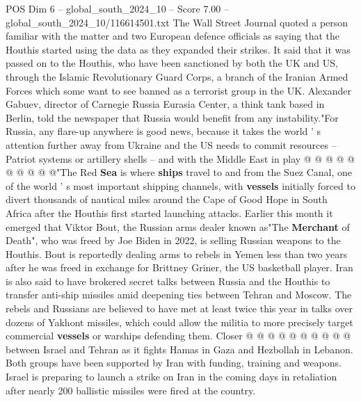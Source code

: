 \begin{textsample}{POS Dim 6 – global\_south\_2024\_10 – Score 7.00 – global\_south\_2024\_10/116614501.txt}
The Wall Street Journal quoted a person familiar with the matter and two European defence officials as saying that the Houthis started using the data as they expanded their strikes.
It said that it was passed on to the Houthis, who have been sanctioned by both the UK and US, through the Islamic Revolutionary Guard Corps, a branch of the Iranian Armed Forces which some want to see banned as a terrorist group in the UK.
Alexander Gabuev, director of Carnegie Russia Eurasia Center, a think tank based in Berlin, told the newspaper that Russia would benefit from any instability."For Russia, any flare-up anywhere is good news, because it takes the world ' s attention further away from Ukraine and the US needs to commit resources -- Patriot systems or artillery shells -- and with the Middle East in play @ @ @ @ @ @ @ @ @ @"The Red \textbf{Sea} is where \textbf{ships} travel to and from the Suez Canal, one of the world ' s most important shipping channels, with \textbf{vessels} initially forced to divert thousands of nautical miles around the Cape of Good Hope in South Africa after the Houthis first started launching attacks.
Earlier this month it emerged that Viktor Bout, the Russian arms dealer known as"The \textbf{Merchant} of Death", who was freed by Joe Biden in 2022, is selling Russian weapons to the Houthis.
Bout is reportedly dealing arms to rebels in Yemen less than two years after he was freed in exchange for Brittney Griner, the US basketball player.
Iran is also said to have brokered secret talks between Russia and the Houthis to transfer anti-ship missiles amid deepening ties between Tehran and Moscow.
The rebels and Russians are believed to have met at least twice this year in talks over dozens of Yakhont missiles, which could allow the militia to more precisely target commercial \textbf{vessels} or warships defending them.
Closer @ @ @ @ @ @ @ @ @ @ between Israel and Tehran as it fights Hamas in Gaza and Hezbollah in Lebanon.
Both groups have been supported by Iran with funding, training and weapons.
Israel is preparing to launch a strike on Iran in the coming days in retaliation after nearly 200 ballistic missiles were fired at the country.

\end{textsample}
